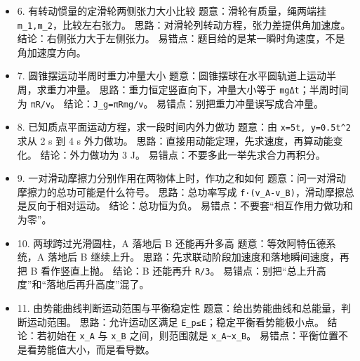 \documentclass[12pt,a4paper]{ctexart}
\begin{document}
\begin{itemize}

\item 6. 有转动惯量的定滑轮两侧张力大小比较 题意：滑轮有质量，绳两端挂 \texttt{m\_1,m\_2}，比较左右张力。 思路：对滑轮列转动方程，张力差提供角加速度。 结论：右侧张力大于左侧张力。 易错点：题目给的是某一瞬时角速度，不是角加速度方向。

\end{itemize}

\begin{itemize}

\item 7. 圆锥摆运动半周时重力冲量大小 题意：圆锥摆球在水平圆轨道上运动半周，求重力冲量。 思路：重力恒定竖直向下，冲量大小等于 \texttt{mgΔt}；半周时间为 \texttt{πR/v}。 结论：\texttt{J\_g=πRmg/v}。 易错点：别把重力冲量误写成合冲量。

\end{itemize}

\begin{itemize}

\item 8. 已知质点平面运动方程，求一段时间内外力做功 题意：由 \texttt{x=5t, y=0.5t\textasciicircum{}2} 求从 2 s 到 4 s 外力做功。 思路：直接用动能定理，先求速度，再算动能变化。 结论：外力做功为 3 J。 易错点：不要多此一举先求合力再积分。

\end{itemize}

\begin{itemize}

\item 9. 一对滑动摩擦力分别作用在两物体上时，作功之和如何 题意：问一对滑动摩擦力的总功可能是什么符号。 思路：总功率写成 \texttt{f·(v\_A-v\_B)}，滑动摩擦总是反向于相对运动。 结论：总功恒为负。 易错点：不要套“相互作用力做功和为零”。

\end{itemize}

\begin{itemize}

\item 10. 两球跨过光滑圆柱，A 落地后 B 还能再升多高 题意：等效阿特伍德系统，A 落地后 B 继续上升。 思路：先求联动阶段加速度和落地瞬间速度，再把 B 看作竖直上抛。 结论：B 还能再升 \texttt{R/3}。 易错点：别把“总上升高度”和“落地后再升高度”混了。

\end{itemize}

\begin{itemize}

\item 11. 由势能曲线判断运动范围与平衡稳定性 题意：给出势能曲线和总能量，判断运动范围。 思路：允许运动区满足 \texttt{E\_p≤E}；稳定平衡看势能极小点。 结论：若初始在 \texttt{x\_A} 与 \texttt{x\_B} 之间，则范围就是 \texttt{x\_A\textasciitilde{}x\_B}。 易错点：平衡位置不是看势能值大小，而是看导数。

\end{itemize}
\end{document}
